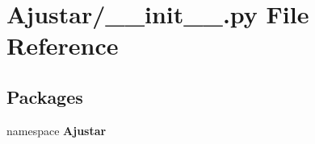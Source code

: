 \section{\-Ajustar/\-\_\-\-\_\-init\-\_\-\-\_\-.py \-File \-Reference}
\label{_ajustar_2____init_____8py}
\subsection*{\-Packages}
\begin{DoxyCompactItemize}
\item 
namespace {\bf \-Ajustar}
\end{DoxyCompactItemize}
